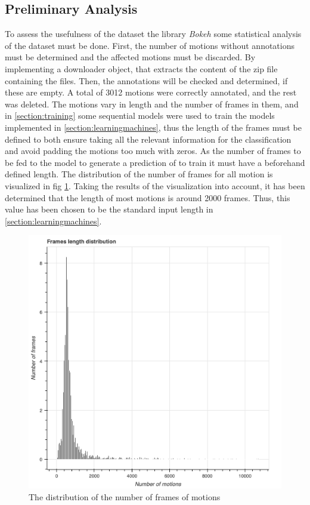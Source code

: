 		\subsection{Preliminary Analysis}\label{subsec:preliminary_analysis}
			To assess the usefulness of the dataset the library \textit{Bokeh} some statistical analysis of the dataset must be done. First, the number of motions without annotations must be determined and the affected motions must be discarded. By implementing a downloader object, that extracts the content of the zip file containing the files. Then, the annotations will be checked and determined, if these are empty. A total of 3012 motions were correctly annotated, and the rest was deleted.\newline
			The motions vary in length and the number of frames in them, and in \ref{section:training} some sequential models were used to train the models implemented in \ref{section:learningmachines}, thus the length of the frames must be defined to both ensure taking all the relevant information for the classification and avoid padding the motions too much with zeros. As the number of frames to be fed to the model to generate a prediction of to train it must have a beforehand defined length. The distribution of the number of frames for all motion is visualized in fig \ref{fig:num_frames_distro}. Taking the results of the visualization into account, it has been determined that the length of most motions is around 2000 frames. Thus, this value has been chosen to be the standard input length in \ref{section:learningmachines}.\newline
			\begin{figure}[H]
				\centering
				\includegraphics[width=.9\textwidth]{img/num-frames-ditro.png}
				\caption{The distribution of the number of frames of motions}
				\label{fig:num_frames_distro}
			\end{figure}
